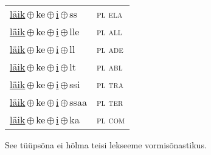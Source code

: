 \begin{minipage}{\textwidth}
\begin{sideways}
\begin{tabular}{l l}
\underline{läik}\,$\oplus$\,ke\,$\oplus$\,\underline{i}\,$\oplus$\,ss & \textsc{ pl ela } \\
\underline{läik}\,$\oplus$\,ke\,$\oplus$\,\underline{i}\,$\oplus$\,lle & \textsc{ pl all } \\
\underline{läik}\,$\oplus$\,ke\,$\oplus$\,\underline{i}\,$\oplus$\,ll & \textsc{ pl ade } \\
\underline{läik}\,$\oplus$\,ke\,$\oplus$\,\underline{i}\,$\oplus$\,lt & \textsc{ pl abl } \\
\underline{läik}\,$\oplus$\,ke\,$\oplus$\,\underline{i}\,$\oplus$\,ssi & \textsc{ pl tra } \\
\underline{läik}\,$\oplus$\,ke\,$\oplus$\,\underline{i}\,$\oplus$\,ssaa & \textsc{ pl ter } \\
\underline{läik}\,$\oplus$\,ke\,$\oplus$\,\underline{i}\,$\oplus$\,ka & \textsc{ pl com } \\
\end{tabular}
\end{sideways}
\label{tab:tüüpsõnamall-läikki}

\end{minipage}

 
\vspace{1em}
\noindent See tüüpsõna ei hõlma teisi lekseeme vormi\-sõnastikus.
